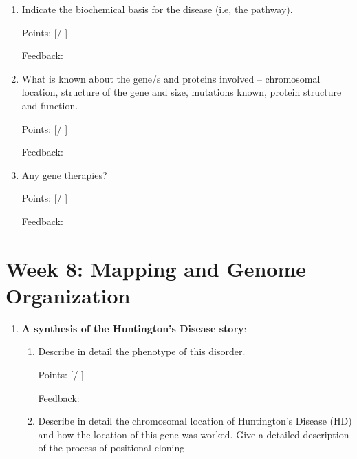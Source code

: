 \documentclass[basic]{inVerba-notes}
\begin{document}
{\begin{enumerate}
\begin{enumerate}
    \basec{-----}

    Points: [\qquad / \qquad ]

    Feedback: 

    \vspace*{40pt}
    \item Indicate the biochemical basis for the disease (i.e, the pathway).
    
    \basec{-----}

    Points: [\qquad / \qquad ]

    Feedback: 

    \vspace*{40pt}
    \item What is known about the gene/s and proteins involved – chromosomal location, structure of the gene and size, mutations known, protein structure and function.
    
    \basec{-----}

    Points: [\qquad / \qquad ]

    Feedback: 

    \vspace*{40pt}
    \item Any gene therapies?
    
    \basec{-----}

    Points: [\qquad / \qquad ]

    Feedback: 

    \vspace*{40pt}
  \end{enumerate}

\end{enumerate}
  

\section{Week 8: Mapping and Genome Organization}

\begin{enumerate}
  \item \textbf{A synthesis of the Huntington’s Disease story}:
  
  \begin{enumerate}
    \item  Describe in detail the phenotype of this disorder.
    
    \basec{-----}

    Points: [\qquad / \qquad ]

    Feedback: 

    \vspace*{40pt}
    \item Describe in detail the chromosomal location of Huntington’s Disease (HD) and how the location of this gene was worked. Give a detailed description of the process of positional cloning
    

\end{enumerate}
\end{enumerate}}
\end{document}
